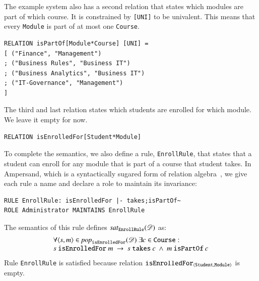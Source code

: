 \documentclass{elsarticle}
\begin{document}
   The example system also has a second relation that states which modules are part of which course.
   It is constrained by \verb-[UNI]- to be univalent.
   This means that every \verb-Module- is part of at most one \verb-Course-.
\begin{verbatim}
RELATION isPartOf[Module*Course] [UNI] =
[ ("Finance", "Management")
; ("Business Rules", "Business IT")
; ("Business Analytics", "Business IT")
; ("IT-Governance", "Management")
]
\end{verbatim}
   The third and last relation states which students are enrolled for which module.
   We leave it empty for now.
\begin{verbatim}
RELATION isEnrolledFor[Student*Module]
\end{verbatim}

   To complete the semantics,
   we also define a rule, {\tt EnrollRule}, that states that a student can enroll for any module that is part of a course that student takes.
   In Ampersand, which is a syntactically sugared form of relation algebra~\cite{JoostenRAMiCS2017},
   we give each rule a name and declare a role to maintain its invariance:
\begin{verbatim}
RULE EnrollRule: isEnrolledFor |- takes;isPartOf~
ROLE Administrator MAINTAINS EnrollRule
\end{verbatim}
   The semantics of this rule defines $\text{\it sat\/}_{\tt EnrollRule}(\mathscr{D})$ as:
\begin{equation}
   \begin{array}{l}
   \forall \pair{s}{m}\in\pop{\tt isEnrolledFor}{\dataset}\ \exists c\in\text{\tt Course}:\\
s\ \text{\tt isEnrolledFor}\ m\ \rightarrow\ s\ \text{\tt takes}\ c\ \wedge\ m\ \text{\tt isPartOf}\ c
\end{array}
\label{eqn:example isEnrolledFor}
\end{equation}
   Rule {\tt EnrollRule} is satisfied because relation $\text{\it \tt isEnrolledFor\/}_{\langle{\tt Student},{\tt Module}\rangle}$ is empty.
\end{document}
